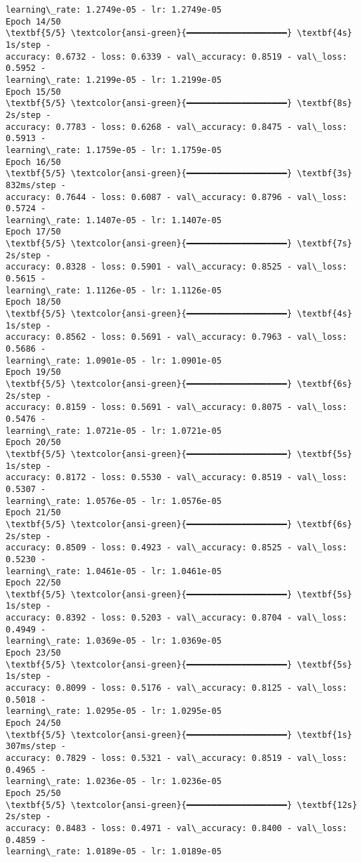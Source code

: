 \documentclass[11pt]{article}
\begin{document}
\begin{Verbatim}[commandchars=\\\{\}]
learning\_rate: 1.2749e-05 - lr: 1.2749e-05
Epoch 14/50
\textbf{5/5} \textcolor{ansi-green}{━━━━━━━━━━━━━━━━━━━━} \textbf{4s} 1s/step -
accuracy: 0.6732 - loss: 0.6339 - val\_accuracy: 0.8519 - val\_loss: 0.5952 -
learning\_rate: 1.2199e-05 - lr: 1.2199e-05
Epoch 15/50
\textbf{5/5} \textcolor{ansi-green}{━━━━━━━━━━━━━━━━━━━━} \textbf{8s} 2s/step -
accuracy: 0.7783 - loss: 0.6268 - val\_accuracy: 0.8475 - val\_loss: 0.5913 -
learning\_rate: 1.1759e-05 - lr: 1.1759e-05
Epoch 16/50
\textbf{5/5} \textcolor{ansi-green}{━━━━━━━━━━━━━━━━━━━━} \textbf{3s} 832ms/step -
accuracy: 0.7644 - loss: 0.6087 - val\_accuracy: 0.8796 - val\_loss: 0.5724 -
learning\_rate: 1.1407e-05 - lr: 1.1407e-05
Epoch 17/50
\textbf{5/5} \textcolor{ansi-green}{━━━━━━━━━━━━━━━━━━━━} \textbf{7s} 2s/step -
accuracy: 0.8328 - loss: 0.5901 - val\_accuracy: 0.8525 - val\_loss: 0.5615 -
learning\_rate: 1.1126e-05 - lr: 1.1126e-05
Epoch 18/50
\textbf{5/5} \textcolor{ansi-green}{━━━━━━━━━━━━━━━━━━━━} \textbf{4s} 1s/step -
accuracy: 0.8562 - loss: 0.5691 - val\_accuracy: 0.7963 - val\_loss: 0.5686 -
learning\_rate: 1.0901e-05 - lr: 1.0901e-05
Epoch 19/50
\textbf{5/5} \textcolor{ansi-green}{━━━━━━━━━━━━━━━━━━━━} \textbf{6s} 2s/step -
accuracy: 0.8159 - loss: 0.5691 - val\_accuracy: 0.8075 - val\_loss: 0.5476 -
learning\_rate: 1.0721e-05 - lr: 1.0721e-05
Epoch 20/50
\textbf{5/5} \textcolor{ansi-green}{━━━━━━━━━━━━━━━━━━━━} \textbf{5s} 1s/step -
accuracy: 0.8172 - loss: 0.5530 - val\_accuracy: 0.8519 - val\_loss: 0.5307 -
learning\_rate: 1.0576e-05 - lr: 1.0576e-05
Epoch 21/50
\textbf{5/5} \textcolor{ansi-green}{━━━━━━━━━━━━━━━━━━━━} \textbf{6s} 2s/step -
accuracy: 0.8509 - loss: 0.4923 - val\_accuracy: 0.8525 - val\_loss: 0.5230 -
learning\_rate: 1.0461e-05 - lr: 1.0461e-05
Epoch 22/50
\textbf{5/5} \textcolor{ansi-green}{━━━━━━━━━━━━━━━━━━━━} \textbf{5s} 1s/step -
accuracy: 0.8392 - loss: 0.5203 - val\_accuracy: 0.8704 - val\_loss: 0.4949 -
learning\_rate: 1.0369e-05 - lr: 1.0369e-05
Epoch 23/50
\textbf{5/5} \textcolor{ansi-green}{━━━━━━━━━━━━━━━━━━━━} \textbf{5s} 1s/step -
accuracy: 0.8099 - loss: 0.5176 - val\_accuracy: 0.8125 - val\_loss: 0.5018 -
learning\_rate: 1.0295e-05 - lr: 1.0295e-05
Epoch 24/50
\textbf{5/5} \textcolor{ansi-green}{━━━━━━━━━━━━━━━━━━━━} \textbf{1s} 307ms/step -
accuracy: 0.7829 - loss: 0.5321 - val\_accuracy: 0.8519 - val\_loss: 0.4965 -
learning\_rate: 1.0236e-05 - lr: 1.0236e-05
Epoch 25/50
\textbf{5/5} \textcolor{ansi-green}{━━━━━━━━━━━━━━━━━━━━} \textbf{12s} 2s/step -
accuracy: 0.8483 - loss: 0.4971 - val\_accuracy: 0.8400 - val\_loss: 0.4859 -
learning\_rate: 1.0189e-05 - lr: 1.0189e-05

\end{Verbatim}
\end{document}
